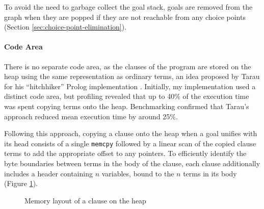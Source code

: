 To avoid the need to garbage collect the goal stack, goals are removed from the graph when they are popped if they are not reachable from any choice points (Section \ref{sec:choice-point-elimination}).

\paragraph{Code Area} There is no separate code area, as the clauses of the program are stored on the heap using the same representation as ordinary terms, an idea proposed by Tarau for his ``hitchhiker'' Prolog implementation \cite{tarauHitchhikersGuideReinventing2018}. Initially, my implementation used a distinct code area, but profiling revealed that up to 40\% of the execution time was spent copying terms onto the heap. Benchmarking confirmed that Tarau's approach reduced mean execution time by around 25\%.

Following this approach, copying a clause onto the heap when a goal unifies with its head consists of a single \texttt{memcpy} followed by a linear scan of the copied clause terms to add the appropriate offset to any pointers. To efficiently identify the byte boundaries between terms in the body of the clause, each clause additionally includes a header containing $n$ variables, bound to the $n$ terms in its body (Figure \ref{fig:clause-layout}).

\begin{figure}[H]
\centering
{}
\caption{Memory layout of a clause on the heap}
\label{fig:clause-layout}
\end{figure}


